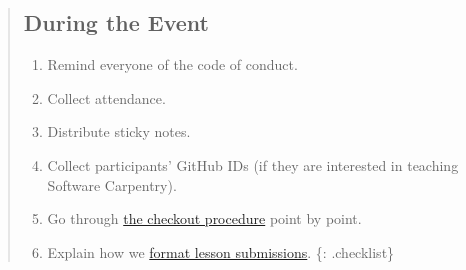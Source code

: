 \begin{quote}
\subsection{During the Event}\label{during-the-event}

\begin{enumerate}
\def\labelenumi{\arabic{enumi}.}
\itemsep1pt\parskip0pt
\item
  Remind everyone of the code of conduct.
\item
  Collect attendance.
\item
  Distribute sticky notes.
\item
  Collect participants' GitHub IDs (if they are interested in teaching
  Software Carpentry).
\item
  Go through
  \href{\{\{\%20page.root\%20\}\}/files/messages/checkout.txt}{the
  checkout procedure} point by point.
\item
  Explain how we
  \href{\{\{\%20page.root\%20\}\}/files/messages/format.txt}{format
  lesson submissions}. \{: .checklist\}
\end{enumerate}
\end{quote}

